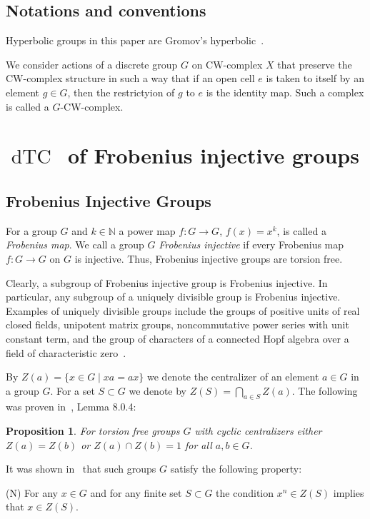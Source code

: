 \documentclass{amsart}
\numberwithin{equation}{section}
\theoremstyle{plain}
\newtheorem{prop}[thm]{Proposition}
\theoremstyle{definition}
\def\dTC{{\mathop\mathrm{dTC}\,}}
\begin{document}
\subsection{Notations and conventions}


 Hyperbolic groups in this paper are Gromov's hyperbolic~\cite{Gr}.



We consider actions of a discrete group $G$ on CW-complex $X$ that preserve the CW-complex structure in such a way that if an open cell $e$ is taken  to itself by an element $g\in G$,
then the restrictyion of $g$  to $e$ is the identity map. Such a complex is called a $G$-CW-complex.


\section{$\dTC$ of Frobenius injective groups}

\subsection{Frobenius Injective Groups}
For a group $G$  and  $k\in \mathbb N$ a power map $f:G\to G$, $f(x)=x^k$, is called a {\em Frobenius map}.
We call a group $G$ {\em Frobenius injective} if every  Frobenius map $f:G\to G$ on $G$ is injective.
Thus, Frobenius injective groups are torsion free.

Clearly, a subgroup of Frobenius injective group is Frobenius injective. In particular,
any subgroup of a uniquely divisible group is Frobenius injective.
Examples of uniquely divisible groups include the groups of positive units
of real closed fields, unipotent matrix groups, noncommutative power series with unit constant
term, and the group of characters of a connected Hopf algebra over a field of characteristic
zero~\cite{Ba,ABS,HLR}.

By $Z(a)=\{x\in G\mid xa=ax\}$ we denote the centralizer of an element $a\in G$ in a group $G$.
For a set $S\subset G$ we denote by $Z(S)=\bigcap_{a\in S} Z(a)$.
The following was proven in~\cite{FGLO}, Lemma 8.0.4:
\begin{prop}\label{central}
For torsion free groups $G$ with cyclic centralizers either $Z(a)=Z(b)$ or $Z(a)\cap Z(b)=1$ for all $a,b\in G$.
\end{prop}
It was shown in~\cite{FGLO} that such groups $G$ satisfy the following property:

(N) For any $x\in G$ and for any finite set $S\subset G$ the condition $x^n\in Z(S)$ implies that $x\in Z(S)$.
\end{document}
